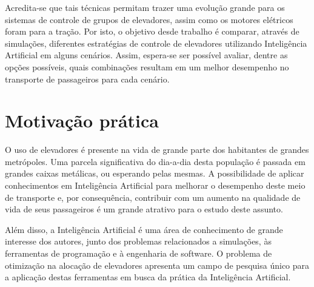 Acredita-se que tais técnicas permitam trazer uma evolução grande para os
sistemas de controle de grupos de elevadores, assim como os motores elétricos
foram para a tração. Por isto, o objetivo desde trabalho é comparar, através de
simulações, diferentes estratégias de controle de elevadores utilizando
Inteligência Artificial em alguns cenários. Assim, espera-se ser possível
avaliar, dentre as opções possíveis, quais combinações resultam em um melhor
desempenho no transporte de passageiros para cada cenário.

\section{\label{section:motivation}Motivação prática}

O uso de elevadores é presente na vida de grande parte dos habitantes de grandes
metrópoles. Uma parcela significativa do dia-a-dia desta população é passada em
grandes caixas metálicas, ou esperando pelas mesmas. A possibilidade de aplicar
conhecimentos em Inteligência Artificial para melhorar o desempenho deste meio
de transporte e, por consequência, contribuir com um aumento na qualidade de
vida de seus passageiros é um grande atrativo para o estudo deste assunto.

Além disso, a Inteligência Artificial é uma área de conhecimento de grande
interesse dos autores, junto dos problemas relacionados a simulações, às
ferramentas de programação e à engenharia de software. O problema de otimização
na alocação de elevadores apresenta um campo de pesquisa único para a aplicação
destas ferramentas em busca da prática da Inteligência Artificial.
